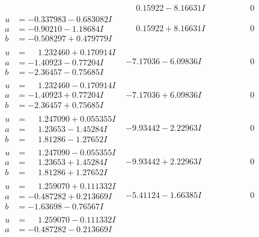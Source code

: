 \documentclass[1p]{elsarticle_modified}
\theoremstyle{definition}
\begin{document}
$$\begin{array}{c|c|c}
 & \phantom{-}0.15922 - 8.16631 I & \phantom{-0.000000 } 0 \\ \hline\begin{aligned}
u &= -0.337983 - 0.683082 I \\
a &= -0.90210 - 1.18684 I \\
b &= -0.508297 + 0.479779 I\end{aligned}
 & \phantom{-}0.15922 + 8.16631 I & \phantom{-0.000000 } 0 \\ \hline\begin{aligned}
u &= \phantom{-}1.232460 + 0.170914 I \\
a &= -1.40923 - 0.77204 I \\
b &= -2.36457 - 0.75685 I\end{aligned}
 & -7.17036 - 6.09836 I & \phantom{-0.000000 } 0 \\ \hline\begin{aligned}
u &= \phantom{-}1.232460 - 0.170914 I \\
a &= -1.40923 + 0.77204 I \\
b &= -2.36457 + 0.75685 I\end{aligned}
 & -7.17036 + 6.09836 I & \phantom{-0.000000 } 0 \\ \hline\begin{aligned}
u &= \phantom{-}1.247090 + 0.055355 I \\
a &= \phantom{-}1.23653 - 1.45284 I \\
b &= \phantom{-}1.81286 - 1.27652 I\end{aligned}
 & -9.93442 - 2.22963 I & \phantom{-0.000000 } 0 \\ \hline\begin{aligned}
u &= \phantom{-}1.247090 - 0.055355 I \\
a &= \phantom{-}1.23653 + 1.45284 I \\
b &= \phantom{-}1.81286 + 1.27652 I\end{aligned}
 & -9.93442 + 2.22963 I & \phantom{-0.000000 } 0 \\ \hline\begin{aligned}
u &= \phantom{-}1.259070 + 0.111332 I \\
a &= -0.487282 + 0.213669 I \\
b &= -1.63698 - 0.76567 I\end{aligned}
 & -5.41124 - 1.66385 I & \phantom{-0.000000 } 0 \\ \hline\begin{aligned}
u &= \phantom{-}1.259070 - 0.111332 I \\
a &= -0.487282 - 0.213669 I \\

\end{aligned}
\end{array}$$
\end{document}
